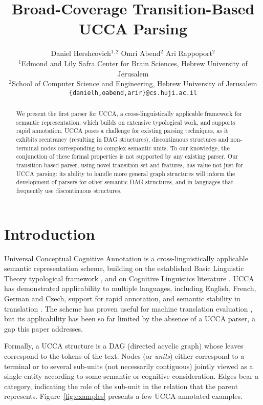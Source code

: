 \documentclass[11pt,a4paper]{article}
\title{Broad-Coverage Transition-Based UCCA Parsing}
\author{Daniel Hershcovich$^{1,2}$ \And Omri Abend$^2$ \And Ari Rappoport$^2$ \\
  $^1$Edmond and Lily Safra Center for Brain Sciences, Hebrew University of Jerusalem \\
  $^2$School of Computer Science and Engineering, Hebrew University of Jerusalem \\
  \texttt{\{danielh,oabend,arir\}@cs.huji.ac.il}
}
\date{}
\newcommand{\figref}[1]{Figure~\ref{#1}}
\begin{document}
\maketitle

\begin{abstract}
  We present the first parser for UCCA, a
  cross-linguistically applicable framework for semantic
  representation, which builds on extensive
  typological work, and supports rapid annotation.
  UCCA poses a challenge for existing parsing techniques,
  as it exhibits reentrancy (resulting in DAG structures),
  discontinuous structures and non-terminal nodes corresponding
  to complex semantic units. To our knowledge, the conjunction
  of these formal properties is not supported by any existing parser.
  Our transition-based parser, using novel transition set
  and features, has value not just for UCCA parsing:
  its ability to handle more general graph structures will inform
  the development of parsers for other semantic DAG structures, 
  and in languages that frequently use discontinuous structures.
\end{abstract}


\section{Introduction}\label{sec:introduction}

Universal Conceptual Cognitive Annotation \cite[UCCA,][]{abend2013universal}
is a cross-linguistically applicable semantic representation scheme,
building on the established Basic Linguistic Theory typological framework
\cite{Dixon:10b,Dixon:10a,Dixon:12}, and on Cognitive
Linguistics literature \cite{croft2004cognitive}.
UCCA has demonstrated applicability to multiple languages, including
English, French, German and Czech, support for rapid annotation,
and semantic stability in translation \cite{sulem2015conceptual}.
The scheme has proven useful for machine translation evaluation \cite{birch2016hume},
but its applicability has been so far limited by the absence of a UCCA parser,
a gap this paper addresses.

Formally, a UCCA structure is a DAG (directed acyclic graph)
whose leaves correspond to the tokens of
the text. Nodes (or {\it units}) either correspond to a terminal or
to several sub-units (not necessarily contiguous) jointly viewed as a
single entity according to some semantic or cognitive consideration.
Edges bear a category, indicating the role of the sub-unit in the relation
that the parent represents. \figref{fig:examples} presents a few UCCA-annotated examples.
\end{document}

